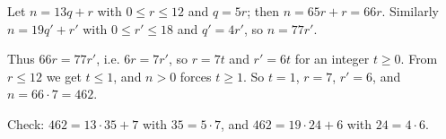 Let $n=13q+r$ with $0\le r\le12$ and $q=5r$; then $n=65r+r=66r$. Similarly $n=19q'+r'$ with $0\le r'\le18$ and $q'=4r'$, so $n=77r'$.

Thus $66r=77r'$, i.e. $6r=7r'$, so $r=7t$ and $r'=6t$ for an integer $t\ge0$. From $r\le12$ we get $t\le1$, and $n>0$ forces $t\ge1$. So $t=1$, $r=7$, $r'=6$, and $n=66\cdot7=\boxed{462}$.

Check: $462=13\cdot35+7$ with $35=5\cdot7$, and $462=19\cdot24+6$ with $24=4\cdot6$.
